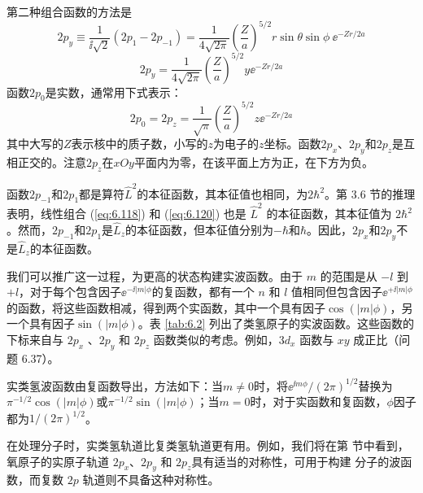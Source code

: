     第二种组合函数的方法是
    \begin{equation}
        2p_y \equiv \frac{1}{\ii \sqrt{2}}\left(2p_1 - 2p_{-1}\right) = \frac{1}{4\sqrt{2\pi}}\left(\frac{Z}{a}\right)^{5/2}r\sin\theta\sin\phi\:\ee ^{-Zr/2a}
        \label{eq:6.120}
    \end{equation}
    \begin{equation}
        2p_y = \frac{1}{4\sqrt{2\pi}}\left(\frac{Z}{a}\right)^{5/2}y\ee ^{-Zr/2a}
        \label{eq:6.121}
    \end{equation}
    函数$2p_0$是实数，通常用下式表示：
    \begin{equation}
        2p_0 = 2p_z = \frac{1}{\sqrt{\pi}}\left(\frac{Z}{a}\right)^{5/2}z\ee ^{-Zr/2a}
        \label{eq:6.122}
    \end{equation}
    其中大写的$Z$表示核中的质子数，小写的$z$为电子的$z$坐标。函数$2p_x$、$2p_y$和$2p_z$是互相正交的。注意$2p_z$在$xOy$平面内为零，在该平面上方为正，在下方为负。

    函数$2p_{-1}$和$2p_1$都是算符$\hat{L}^2$的本征函数，其本征值也相同，为$2\hbar^2$。第 3.6 节的推理表明，线性组合 (\ref{eq:6.118}) 和 (\ref{eq:6.120}) 也是 $\hat{L}^2$ 的本征函数，其本征值为 $2\hbar^2$ 。然而，$2p_{-1}$和$2p_1$是$\hat{L}_z$的本征函数，但本征值分别为$-\hbar$和$\hbar$。因此，$2p_x$和$2p_y$不是$\hat{L}_z$的本征函数。

    我们可以推广这一过程，为更高的状态构建实波函数。由于 $m$ 的范围是从 $- l$ 到 $+ l$，对于每个包含因子$\ee ^{-\ii \left|m\right|\phi}$的复函数，都有一个 $n$ 和 $l$ 值相同但包含因子$\ee ^{+\ii \left|m\right|\phi}$的函数，将这些函数相减，得到两个实函数，其中一个具有因子$\cos\left(\left|m\right|\phi\right)$，另一个具有因子$\sin\left(\left|m\right|\phi\right)$。表 \ref{tab:6.2} 列出了类氢原子的实波函数。这些函数的下标来自与 $2p_x$ 、$2p_y$ 和 $2p_z$ 函数类似的考虑。例如，$3d_{x}$ 函数与 $xy$ 成正比（问题 6.37）。

    实类氢波函数由复函数导出，方法如下：当$m \neq 0$时，将$\ee ^{\ii m\phi}/\left(2\pi\right)^{1/2}$替换为$\pi^{-1/2}\cos\left(\left|m\right|\phi\right)$或$\pi^{-1/2}\sin\left(\left|m\right|\phi\right)$；当$m=0$时，对于实函数和复函数，$\phi$因子都为$1/\left(2\pi\right)^{1/2}$。

    在处理分子时，实类氢轨道比复类氢轨道更有用。例如，我们将在第 节中看到，氧原子的实原子轨道 $2p_x$、$2p_y$ 和 $2p_z$具有适当的对称性，可用于构建  分子的波函数，而复数 $2p$ 轨道则不具备这种对称性。

